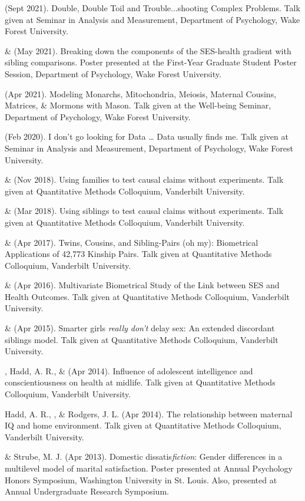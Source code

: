 
\item\meb (Sept 2021). Double, Double Toil and Trouble...shooting Complex Problems. Talk given at Seminar in Analysis and Measurement, Department of Psychology, Wake Forest University. 
%
\item \yrh \& \meb (May 2021). Breaking down the components of the SES-health gradient with sibling comparisons. Poster presented at the First-Year Graduate Student Poster Session, Department of Psychology, Wake Forest University. 
%
\item\meb (Apr 2021). Modeling Monarchs, Mitochondria, Meiosis, Maternal Cousins, Matrices, \& Mormons with Mason. Talk given at the Well-being Seminar, Department of Psychology, Wake Forest University. 
%
\item\meb (Feb 2020). I don't go looking for Data … Data usually finds me. Talk given at Seminar in Analysis and Measurement, Department of Psychology, Wake Forest University. 
%
\item\meb \& \Joe (Nov 2018). Using families to test causal claims without experiments. Talk given at Quantitative Methods Colloquium, Vanderbilt University. 
%
\item\meb \& \Joe (Mar 2018). Using siblings to test causal claims without experiments. Talk given at Quantitative Methods Colloquium, Vanderbilt University.
%
\item\meb \& \Joe (Apr 2017). Twins, Cousins, and Sibling-Pairs (oh my): Biometrical Applications of 42,773 Kinship Pairs. Talk given at Quantitative Methods Colloquium, Vanderbilt University. %
%
\item\meb \& \Joe (Apr 2016). Multivariate Biometrical Study of the Link between SES and Health Outcomes. Talk given at Quantitative Methods Colloquium, Vanderbilt University.
%
\item\meb \& \Joe (Apr 2015). Smarter girls \textit{really don't} delay sex: An extended discordant siblings model. Talk given at Quantitative Methods Colloquium, Vanderbilt University.
\item\meb, Hadd, A. R., \& \Joe (Apr 2014). Influence of adolescent intelligence and conscientiousness on health at midlife. Talk given at Quantitative Methods Colloquium, Vanderbilt University. 
%
\item Hadd, A. R., \meb, \& Rodgers, J. L. (Apr 2014). The relationship between maternal IQ and home environment. Talk given at Quantitative Methods Colloquium, Vanderbilt University.
%
\item\meb \& Strube, M. J. (Apr 2013). Domestic dissatis{\em fiction}: Gender differences in a multilevel model of marital satisfaction. Poster presented at Annual Psychology Honors Symposium, Washington University in St. Louis. Also, presented at Annual Undergraduate Research Symposium.
%
